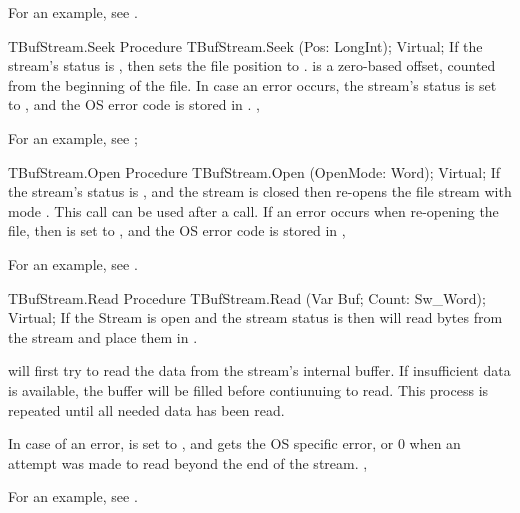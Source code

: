 For an example, see .

\begin{procedure}{TBufStream.Seek}
\Declaration
Procedure TBufStream.Seek (Pos: LongInt); Virtual;
\Description
If the stream's status is , then  sets the 
file position to .  is a zero-based offset, counted from
the beginning of the file.
\Errors
In case an error occurs, the stream's status is set to ,
and the OS error code is stored in .
\SeeAlso
{}, 
\end{procedure}

For an example, see ;

\begin{procedure}{TBufStream.Open}
\Declaration
Procedure TBufStream.Open (OpenMode: Word); Virtual;
\Description
If the stream's status is , and the stream is closed then
 re-opens the file stream with mode .
This call can be used after a  call.
\Errors
If an error occurs when re-opening the file, then  is set
to , and the OS error code is stored in 
\SeeAlso
{}, 
\end{procedure}

For an example, see .

\begin{procedure}{TBufStream.Read}
\Declaration
Procedure TBufStream.Read (Var Buf; Count: Sw\_Word); Virtual;
\Description
If the Stream is open and the stream status is  then 
 will read  bytes from the stream and place them
in  .

 will first try to read the data from the stream's internal
buffer. If insufficient data is available, the buffer will be filled before
contiunuing to read. This process is repeated until all needed data 
has been read.

\Errors
In case of an error,  is set to , and
 gets the OS specific error, or 0 when an attempt was
made to read beyond the end of the stream.
\SeeAlso
{}, 
\end{procedure}

For an example, see .

